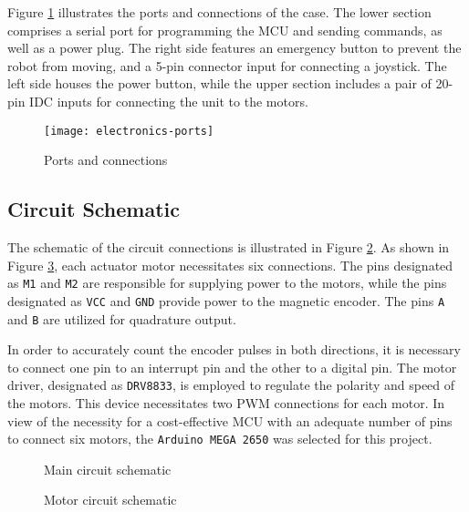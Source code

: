 Figure \ref{fig:electronics-ports} illustrates the ports and connections of the case. The lower section comprises a serial port for programming the MCU and sending commands, as well as a power plug. The right side features an emergency button to prevent the robot from  moving, and a 5-pin connector input for connecting a joystick. The left side houses the power button, while the upper section includes a pair of 20-pin IDC inputs for connecting the unit to the motors.

\begin{figure}
    \centering
    \texttt{[image: electronics-ports]}
    \caption{Ports and connections}
    \label{fig:electronics-ports}
\end{figure}

\subsection{Circuit Schematic}
The schematic of the circuit connections is illustrated in Figure \ref{fig:main-circuit}. As shown in Figure \ref{fig:motor-circuit}, each actuator motor necessitates six connections. The pins designated as \texttt{M1} and \texttt{M2} are responsible for supplying power to the motors, while the pins designated as \texttt{VCC} and \texttt{GND} provide power to the magnetic encoder. The pins \texttt{A} and \texttt{B} are utilized for quadrature output.

In order to accurately count the encoder pulses in both directions, it is necessary to connect one pin to an interrupt pin and the other to a digital pin. The motor driver, designated as \texttt{DRV8833}, is employed to regulate the polarity and speed of the motors. This device necessitates two PWM connections for each motor. In view of the necessity for a cost-effective MCU with an adequate number of pins to connect six motors, the \texttt{Arduino MEGA 2650} was selected for this project.

\begin{figure}
    \centering
    
    \caption{Main circuit schematic}
    \label{fig:main-circuit}
\end{figure}

\begin{figure}
    \centering
    
    \caption{Motor circuit schematic}
    \label{fig:motor-circuit}
\end{figure}
